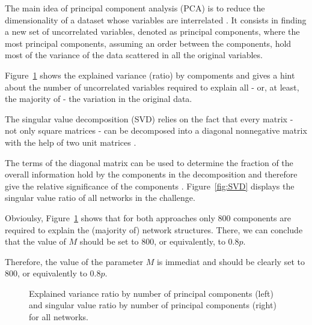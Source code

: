 \documentclass[wcp]{jmlr}
\begin{document}
The main idea of principal component analysis (PCA) is to reduce the
dimensionality of a dataset whose variables are interrelated
\citep{jolliffe2005principal}. It consists in finding a new set of
uncorrelated variables, denoted as principal components, where the most
principal components, assuming an order between the components, hold most of the variance of the data scattered in all the original variables.

Figure~\ref{fig:pca} shows the explained variance (ratio) by compoments and gives a hint about the number of uncorrelated variables required to
explain all - or, at least, the majority of -  the variation in the original data.

The singular value decomposition (SVD) relies on the fact that every matrix -
not only square matrices - can be decomposed into a diagonal nonnegative
matrix with the help of two unit matrices \citep{alter2000singular}.

The terms of the diagonal matrix can be used to determine the fraction of the
overall information hold by the components in the decomposition and therefore
give the relative significance of the components \citep{alter2000singular}.
Figure~\ref{fig:SVD} displays the singular value ratio of all networks in the
challenge.

Obvioulsy, Figure~\ref{fig:pca} shows that for both approaches only 800
components are required to explain the (majority of) network structures.
There, we can conclude that the value of $M$ should be set to 800, or equivalently, to $0.8 p$.


Therefore, the value of the parameter $M$ is immediat and should be clearly
set to $800$, or equivalently to $0.8p$. \\

\begin{figure}[t]
\centering
{}
\caption{Explained variance ratio by number of principal components (left) and singular value ratio by number of principal components (right) for all networks.}
\label{fig:pca}
\end{figure}
\end{document}
